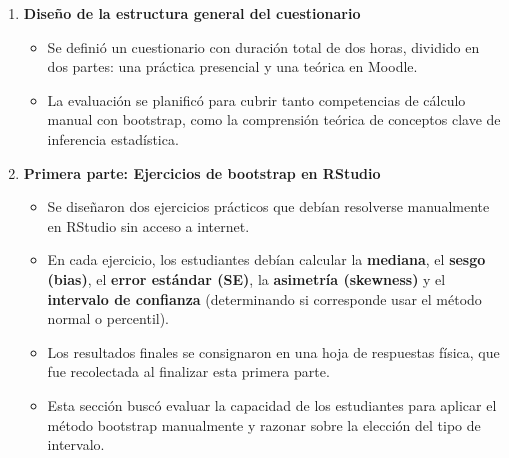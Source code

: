 \documentclass[letter,oneside,12pt,spanish]{report}
\begin{document}
\begin{enumerate}
	\item \textbf{Diseño de la estructura general del cuestionario}  
	\begin{itemize}
		\item Se definió un cuestionario con duración total de dos horas, dividido en dos partes: una práctica presencial y una teórica en Moodle.
		\item La evaluación se planificó para cubrir tanto competencias de cálculo manual con bootstrap, como la comprensión teórica de conceptos clave de inferencia estadística.
	\end{itemize}
	
	\item \textbf{Primera parte: Ejercicios de bootstrap en RStudio}  
	\begin{itemize}
		\item Se diseñaron dos ejercicios prácticos que debían resolverse manualmente en RStudio sin acceso a internet.
		\item En cada ejercicio, los estudiantes debían calcular la \textbf{mediana}, el \textbf{sesgo (bias)}, el \textbf{error estándar (SE)}, la \textbf{asimetría (skewness)} y el \textbf{intervalo de confianza} (determinando si corresponde usar el método normal o percentil).
		\item Los resultados finales se consignaron en una hoja de respuestas física, que fue recolectada al finalizar esta primera parte.
		\item Esta sección buscó evaluar la capacidad de los estudiantes para aplicar el método bootstrap manualmente y razonar sobre la elección del tipo de intervalo.
	\end{itemize}
	

\end{enumerate}
\end{document}
